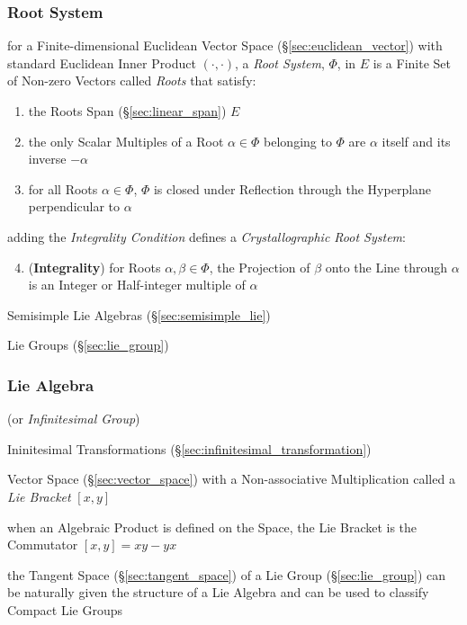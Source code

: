 \subsubsection{Root System}\label{sec:root_system}

for a Finite-dimensional Euclidean Vector Space (\S\ref{sec:euclidean_vector})
with standard Euclidean Inner Product $(\cdot,\cdot)$, a \emph{Root System},
$\Phi$, in $E$ is a Finite Set of Non-zero Vectors called \emph{Roots} that
satisfy:
\begin{enumerate}
  \item the Roots Span (\S\ref{sec:linear_span}) $E$
  \item the only Scalar Multiples of a Root $\alpha \in \Phi$ belonging to
    $\Phi$ are $\alpha$ itself and its inverse $-\alpha$
  \item for all Roots $\alpha \in \Phi$, $\Phi$ is closed under Reflection
    through the Hyperplane perpendicular to $\alpha$
\end{enumerate}

adding the \emph{Integrality Condition} defines a \emph{Crystallographic Root
  System}:
\begin{enumerate}
  \setcounter{enumi}{3}
  \item (\textbf{Integrality}) for Roots $\alpha, \beta \in \Phi$, the
    Projection of $\beta$ onto the Line through $\alpha$ is an Integer or
    Half-integer multiple of $\alpha$
\end{enumerate}

Semisimple Lie Algebras (\S\ref{sec:semisimple_lie})

Lie Groups (\S\ref{sec:lie_group})



\subsubsection{Lie Algebra}\label{sec:lie_algebra}

(or \emph{Infinitesimal Group})

Ininitesimal Transformations
(\S\ref{sec:infinitesimal_transformation})

Vector Space (\S\ref{sec:vector_space}) with a Non-associative
Multiplication called a \emph{Lie Bracket} $[x,y]$

when an Algebraic Product is defined on the Space, the Lie Bracket is
the Commutator $[x,y] = xy - yx$ %

the Tangent Space (\S\ref{sec:tangent_space}) of a Lie Group
(\S\ref{sec:lie_group}) can be naturally given the structure of a Lie Algebra
and can be used to classify Compact Lie Groups

